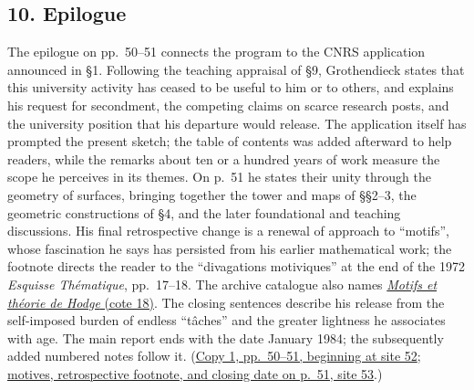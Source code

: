 \documentclass[11pt,a4paper]{article}
\begin{document}
\subsection*{10. Epilogue}
The epilogue on pp.~50--51 connects the program to the CNRS application
announced in \S1. Following the teaching appraisal of \S9, Grothendieck
states that this university activity has ceased to be useful to him or
to others, and explains his request for secondment, the competing claims
on scarce research posts, and the university position that his departure
would release. The application itself has prompted the present sketch;
the table of contents was added afterward to help readers, while the
remarks about ten or a hundred years of work measure the scope he
perceives in its themes. On p.~51 he states their unity through the
geometry of surfaces, bringing together the tower and maps of \S\S2--3,
the geometric constructions of \S4, and the later foundational and
teaching discussions. His final retrospective change is a renewal of
approach to ``motifs'', whose fascination he says has persisted from his
earlier mathematical work; the footnote directs the reader to the
``divagations motiviques'' at the end of the 1972 \emph{Esquisse
Thématique}, pp.~17--18. The archive catalogue also names
\href{https://grothendieck.umontpellier.fr/archives-grothendieck/}{\emph{Motifs et théorie de Hodge} (cote 18)}.
The closing sentences describe his release from the self-imposed burden
of endless ``tâches'' and the greater lightness he associates with age.
The main report ends with the date January 1984; the subsequently added
numbered notes follow it.
(\href{https://grothendieck.umontpellier.fr/web/viewer.html?file=../119.pdf\#page=53}{Copy 1, pp.~50--51, beginning at site 52};
\href{https://grothendieck.umontpellier.fr/web/viewer.html?file=../119.pdf\#page=54}{motives, retrospective footnote, and closing date on p.~51, site 53}.)
\end{document}
